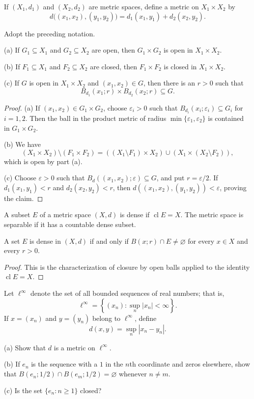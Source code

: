 \begin{de}
If $(X_1,d_1)$ and $(X_2,d_2)$ are metric spaces, define a metric on
$X_1\times X_2$ by
\[
d\bigl((x_1,x_2),(y_1,y_2)\bigr)
=d_1(x_1,y_1)+d_2(x_2,y_2).
\]
\end{de}

\begin{thm}
Adopt the preceding notation.

(a) If $G_1\subseteq X_1$ and $G_2\subseteq X_2$ are open, then
$G_1\times G_2$ is open in $X_1\times X_2$.

(b) If $F_1\subseteq X_1$ and $F_2\subseteq X_2$ are closed, then
$F_1\times F_2$ is closed in $X_1\times X_2$.

(c) If $G$ is open in $X_1\times X_2$ and $(x_1,x_2)\in G$, then there is an
$r>0$ such that
\[
B_{d_1}(x_1;r)\times B_{d_2}(x_2;r)\subseteq G.
\]
\end{thm}

\begin{proof}
(a) If $(x_1,x_2)\in G_1\times G_2$, choose $\varepsilon_i>0$ such that
$B_{d_i}(x_i;\varepsilon_i)\subseteq G_i$ for $i=1,2$. Then the ball in the
product metric of radius $\min\{\varepsilon_1,\varepsilon_2\}$ is contained
in $G_1\times G_2$.

(b) We have
\[
(X_1\times X_2)\setminus(F_1\times F_2)
=((X_1\setminus F_1)\times X_2)\cup(X_1\times(X_2\setminus F_2)),
\]
which is open by part (a).

(c) Choose $\varepsilon>0$ such that
$B_d((x_1,x_2);\varepsilon)\subseteq G$, and put $r=\varepsilon/2$. If
$d_1(x_1,y_1)<r$ and $d_2(x_2,y_2)<r$, then
$d((x_1,x_2),(y_1,y_2))<\varepsilon$, proving the claim.
\end{proof}

\begin{de}
A subset $E$ of a metric space $(X,d)$ is dense if
$\operatorname{cl}E=X$. The metric space is separable if it has a countable
dense subset.
\end{de}

\begin{thm}
A set $E$ is dense in $(X,d)$ if and only if
$B(x;r)\cap E\neq\varnothing$ for every $x\in X$ and every $r>0$.
\end{thm}

\begin{proof}
This is the characterization of closure by open balls applied to the identity
$\operatorname{cl}E=X$.
\end{proof}

\begin{ex}
Let $\ell^\infty$ denote the set of all bounded sequences of real numbers;
that is,
\[
\ell^\infty=\left\{(x_n):\sup_n|x_n|<\infty\right\}.
\]
If $x=(x_n)$ and $y=(y_n)$ belong to $\ell^\infty$, define
\[
d(x,y)=\sup_n|x_n-y_n|.
\]

(a) Show that $d$ is a metric on $\ell^\infty$.

(b) If $e_n$ is the sequence with a $1$ in the $n$th coordinate and zeros
elsewhere, show that
$B(e_n;1/2)\cap B(e_m;1/2)=\varnothing$ whenever $n\neq m$.

(c) Is the set $\{e_n:n\geq1\}$ closed?
\end{ex}

